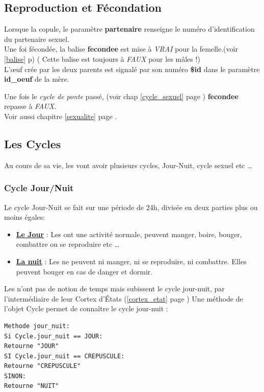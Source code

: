 \documentclass[french]{report}
\newlength{\du}\fi
\begin{document}
\subsection{Reproduction et Fécondation}\label{fecondee}
Lorsque la \CoCiX copule, le paramètre \textbf{partenaire} renseigne le numéro d'identification du partenaire sexuel.\\

Une foi fécondée, la balise \textbf{fecondee} est mise à \textit{VRAI} pour la femelle.(voir \ref{balise} p\pageref{balise})
( Cette balise est toujours à \textit{FAUX} pour les \CoCiX mâles !) \\


L’œuf crée par les deux parents est signalé par son numéro \textbf{\$id} dans le paramètre \textbf{id\_oeuf} de la mère.

Une fois le \textit{cycle de ponte} passé, (voir chap \ref{cycle_sexuel} page \pageref{cycle_sexuel} ) \textbf{fecondee} repasse à \textit{FAUX}.\\

Voir aussi chapitre \ref{sexualite} page \pageref{sexualite}.\\



\subsection{Les Cycles}\label{cycles}
Au cours de sa vie, les \CoCiX vont avoir plusieurs cycles, Jour-Nuit, cycle sexuel etc \dots
\subsubsection{Cycle Jour/Nuit}
Le cycle Jour-Nuit se fait sur une période de 24h, divisée en deux parties plus ou moins égales:

\begin{itemize}
	\item \underline{\textbf{Le Jour}} : Les \CoCiX ont une activité normale, peuvent manger, boire, bouger, combattre ou se reproduire etc \dots
	
	\item \underline{\textbf{La nuit}} : Les \CoCiX ne peuvent ni manger, ni se reproduire, ni combattre. Elles peuvent bouger en cas de danger et  dormir.
\end{itemize}

Les \CoCiX n'ont pas de notion de temps mais subissent le cycle jour-nuit, par l'intermédiaire de leur Cortex d'États (\ref{cortex_etat} page \pageref{cortex_etat}) Une méthode de l'objet Cycle permet de connaître le cycle jour-nuit :\\
\begin{lstlisting}
Methode jour_nuit:
Si Cycle.jour_nuit == JOUR:
Retourne "JOUR"
SI Cycle.jour_nuit == CREPUSCULE:
Retourne "CREPUSCULE"
SINON:
Retourne "NUIT"
\end{lstlisting}	
\end{document}
